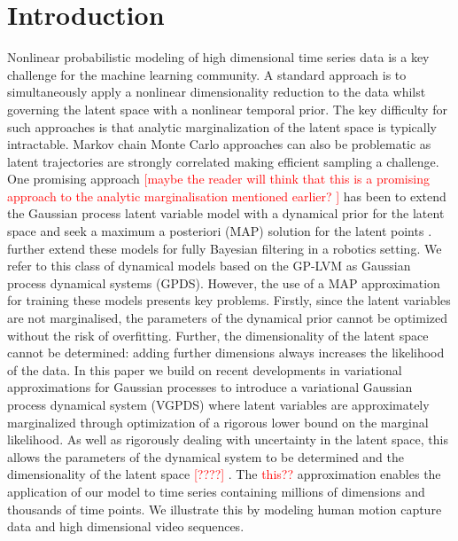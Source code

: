 \documentclass{article} %
\begin{document}
\section{Introduction}

Nonlinear probabilistic modeling of high dimensional time series data
is a key challenge for the machine learning community. A standard
approach is to simultaneously apply a nonlinear dimensionality
reduction to the data whilst governing the latent space with a
nonlinear temporal prior. The key difficulty for such approaches is
that analytic marginalization of the latent space is typically
intractable. Markov chain Monte Carlo approaches can also be
problematic as latent trajectories are strongly correlated making
efficient sampling a challenge. One promising approach
%
%
\textcolor{red}{[maybe the reader will think that this is a promising approach to the analytic marginalisation mentioned earlier? ]}
%
%
 has been to
extend the Gaussian process latent variable model
\cite{GPLVM,GPLVM2} with a dynamical
prior for the latent space and seek a maximum a posteriori (MAP)
solution for the latent points
\cite{GPDM,Wang:gpdm08,hgplvm}. \cite{GP-Based} further extend 
these models for fully Bayesian filtering in a robotics setting. We
refer to this class of dynamical models based on the GP-LVM as
Gaussian process dynamical systems (GPDS). However, the use of a MAP
approximation for training these models presents key problems.
 Firstly, since the latent variables are not marginalised, the parameters
 of the dynamical prior cannot be optimized without the risk of overfitting.
Further, the dimensionality of the latent space cannot be
determined: adding further dimensions always increases the likelihood
of the data. In this paper we build on recent developments in
variational approximations for Gaussian processes
\cite{Titsias09,BayesianGPLVM} to introduce a variational
Gaussian process dynamical system (VGPDS) where latent variables are
approximately marginalized through optimization of a rigorous lower
bound on the marginal likelihood. 
 As well as rigorously dealing with
uncertainty in the latent space, this allows the parameters of the
dynamical system to be determined and the dimensionality of the latent
space \textcolor{red}{[????]}
. The \textcolor{red}{this??} approximation enables the application of our model to time
series containing millions of dimensions and thousands of time
points. We illustrate this by modeling human motion capture data
and high dimensional video sequences.
\end{document}
